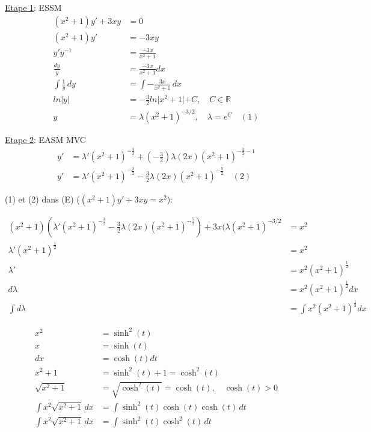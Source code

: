 \underline{Etape 1}: ESSM \\
\begin{align*}
    (x^2+1)y' + 3xy &= 0  \\
    (x^2+1)y' &= -3xy  \\
    y'y^{-1} &= \frac{-3x}{x^2+1} \\
    \frac{dy}{y} &= \frac{-3x}{x^2+1} dx \\
    \int \frac{1}{y} \, dy &= \int -\frac{3x}{x^2+1} \, dx \\
    ln \lvert y \lvert &= -\frac{3}{2} ln \lvert x^2 + 1 \lvert + C, \quad C \in \mathbb{R} \\
    y &= \lambda (x^2 + 1)^{-3/2}, \quad \lambda = e^C \quad (1)
\end{align*}

\underline{Etape 2}: EASM MVC
\begin{align*}
	y' &= \lambda'(x^2+1)^{-\frac{3}{2}} + (-\frac{3}{2}) \lambda (2x)(x^2+1)^{-\frac{3}{2}-1} \\
	y' &= \lambda'(x^2+1)^{-\frac{3}{2}} -\frac{3}{2} \lambda (2x)(x^2+1)^{-\frac{5}{2}} \quad (2) 
\end{align*}

(1) et (2) dans (E) ($(x^2 + 1) y' + 3xy = x^2$):

\begin{align*}
	(x^2 + 1) (\lambda'(x^2+1)^{-\frac{3}{2}} -\frac{3}{2} \lambda (2x)(x^2+1)^{-\frac{5}{2}}) + 3x (\lambda (x^2 + 1)^{-3/2} &= x^2 \\
	\lambda'(x^2+1)^{\frac{1}{2}} &= x^2 \\
	\lambda' &= x^2(x^2 + 1)^{\frac{1}{2}} \\
	d\lambda &= x^2(x^2 + 1)^{\frac{1}{2}} dx \\
	\int d\lambda &= \int x^2(x^2 + 1)^{\frac{1}{2}} dx
\end{align*}

\begin{align*}
	x^2 &= \sinh^2(t) \\
    x &= \sinh(t) \\
	dx &= \cosh(t) dt \\
	x^2 + 1 &= \sinh^2(t) + 1 = \cosh^2(t) \\
	\sqrt{x^2+1} &= \sqrt{\cosh^2(t)} = \cosh(t), \quad \cosh(t) > 0 \\
	\int x^2\sqrt{x^2+1} \, dx &= \int \sinh^2(t) \cosh(t)\cosh(t) \, dt \\
	\int x^2\sqrt{x^2+1} \, dx &= \int \sinh^2(t)\cosh^2(t) \, dt
\end{align*}


